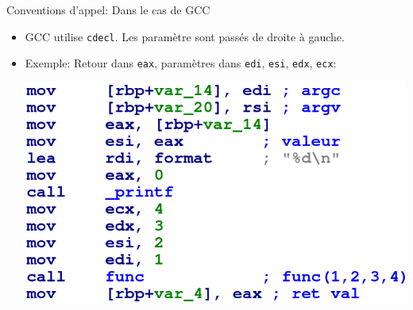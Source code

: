 \documentclass[10pt,xcolor={table,dvipsnames},t]{beamer}
\begin{document}
\begin{frame}{Conventions d'appel: Dans le cas de GCC}
    \begin{itemize}
        \item GCC utilise \texttt{cdecl}. Les paramètre sont passés de droite à gauche.
        \item Exemple: Retour dans \texttt{eax}, paramètres dans \texttt{edi}, \texttt{esi}, \texttt{edx}, \texttt{ecx}:
        
        \begin{center}
            \includegraphics[width=.60\textwidth,height=.55\textheight]{appels}
        \end{center}
    \end{itemize}
\end{frame}



\end{document}
